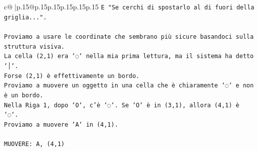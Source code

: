 \documentclass{article}
\begin{document}
{\begin{supertabular}{c@{$\;$}|p{.15\linewidth}@{}p{.15\linewidth}p{.15\linewidth}p{.15\linewidth}p{.15\linewidth}p{.15\linewidth}}
{{{\texttt{E "Se cerchi di spostarlo al di fuori della griglia...".} \\
\\ 
\texttt{Proviamo a usare le coordinate che sembrano più sicure basandoci sulla struttura visiva.} \\
\texttt{La cella (2,1) era `◌` nella mia prima lettura, ma il sistema ha detto `│`.} \\
\texttt{Forse (2,1) è effettivamente un bordo.} \\
\texttt{Proviamo a muovere un oggetto in una cella che è chiaramente `◌` e non è un bordo.} \\
\texttt{Nella Riga 1, dopo `O`, c'è `◌`. Se `O` è in (3,1), allora (4,1) è `◌`.} \\
\texttt{Proviamo a muovere `A` in (4,1).} \\
\\ 
\texttt{MUOVERE: A, (4,1)} \\
            }
        }
    }
     \\ \\


\end{supertabular}}
\end{document}
